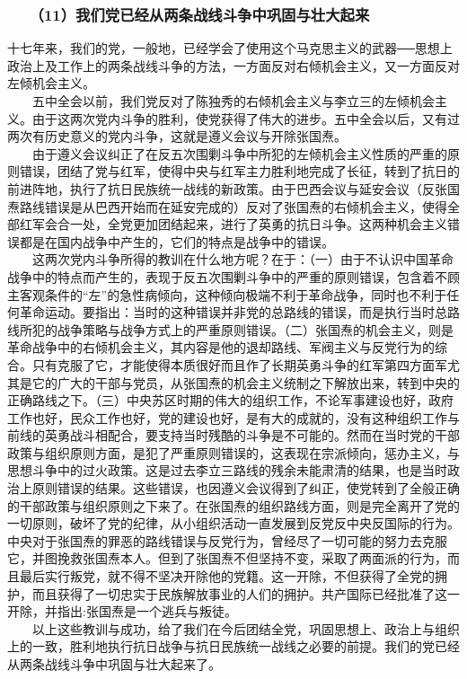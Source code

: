 \documentclass[cn,11pt,chinese]{elegantbook}
\def\myformat#1{\hfil\hfil #1}
\begin{document}
\subsubsection*{\myformat{　　（11）我们党已经从两条战线斗争中巩固与壮大起来}}
十七年来，我们的党，一般地，已经学会了使用这个马克思主义的武器──思想上政治上及工作上的两条战线斗争的方法，一方面反对右倾机会主义，又一方面反对左倾机会主义。\\
　　五中全会以前，我们党反对了陈独秀的右倾机会主义与李立三的左倾机会主义。由于这两次党内斗争的胜利，使党获得了伟大的进步。五中全会以后，又有过两次有历史意义的党内斗争，这就是遵义会议与开除张国焘。\\
　　由于遵义会议纠正了在反五次围剿斗争中所犯的左倾机会主义性质的严重的原则错误，团结了党与红军，使得中央与红军主力胜利地完成了长征，转到了抗日的前进阵地，执行了抗日民族统一战线的新政策。由于巴西会议与延安会议（反张国焘路线错误是从巴西开始而在延安完成的）反对了张国焘的右倾机会主义，使得全部红军会合一处，全党更加团结起来，进行了英勇的抗日斗争。这两种机会主义错误都是在国内战争中产生的，它们的特点是战争中的错误。\\
　　这两次党内斗争所得的教训在什么地方呢？在于：（一）由于不认识中国革命战争中的特点而产生的，表现于反五次围剿斗争中的严重的原则错误，包含着不顾主客观条件的“左”的急性病倾向，这种倾向极端不利于革命战争，同时也不利于任何革命运动。要指出：当时的这种错误并非党的总路线的错误，而是执行当时总路线所犯的战争策略与战争方式上的严重原则错误。（二）张国焘的机会主义，则是革命战争中的右倾机会主义，其内容是他的退却路线、军阀主义与反党行为的综合。只有克服了它，才能使得本质很好而且作了长期英勇斗争的红军第四方面军尤其是它的广大的干部与党员，从张国焘的机会主义统制之下解放出来，转到中央的正确路线之下。（三）中央苏区时期的伟大的组织工作，不论军事建设也好，政府工作也好，民众工作也好，党的建设也好，是有大的成就的，没有这种组织工作与前线的英勇战斗相配合，要支持当时残酷的斗争是不可能的。然而在当时党的干部政策与组织原则方面，是犯了严重原则错误的，这表现在宗派倾向，惩办主义，与思想斗争中的过火政策。这是过去李立三路线的残余未能肃清的结果，也是当时政治上原则错误的结果。这些错误，也因遵义会议得到了纠正，使党转到了全般正确的干部政策与组织原则之下来了。在张国焘的组织路线方面，则是完全离开了党的一切原则，破坏了党的纪律，从小组织活动一直发展到反党反中央反国际的行为。中央对于张国焘的罪恶的路线错误与反党行为，曾经尽了一切可能的努力去克服它，并图挽救张国焘本人。但到了张国焘不但坚持不变，采取了两面派的行为，而且最后实行叛党，就不得不坚决开除他的党籍。这一开除，不但获得了全党的拥护，而且获得了一切忠实于民族解放事业的人们的拥护。共产国际已经批准了这一开除，并指出:张国焘是一个逃兵与叛徒。\\
　　以上这些教训与成功，给了我们在今后团结全党，巩固思想上、政治上与组织上的一致，胜利地执行抗日战争与抗日民族统一战线之必要的前提。我们的党已经从两条战线斗争中巩固与壮大起来了。\\
\end{document}
